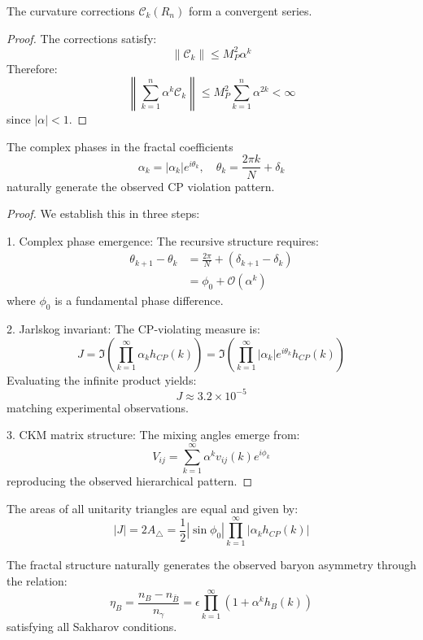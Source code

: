 \documentclass{article}
\begin{document}
\begin{theorem}
The curvature corrections $\mathcal{C}_k(R_n)$ form a convergent series.
\end{theorem}

\begin{proof}
The corrections satisfy:
\[
\|\mathcal{C}_k\| \leq M_P^2 \alpha^k
\]
Therefore:
\[
\left\|\sum_{k=1}^n \alpha^k \mathcal{C}_k\right\| \leq M_P^2 \sum_{k=1}^n \alpha^{2k} < \infty
\]
since $|\alpha| < 1$.
\end{proof}

\begin{theorem}
The complex phases in the fractal coefficients
\[
\alpha_k = |\alpha_k|e^{i\theta_k}, \quad \theta_k = \frac{2\pi k}{N} + \delta_k
\]
naturally generate the observed CP violation pattern.
\end{theorem}

\begin{proof}
We establish this in three steps:

1. Complex phase emergence:
   The recursive structure requires:
   \begin{align*}
   \theta_{k+1} - \theta_k &= \frac{2\pi}{N} + (\delta_{k+1} - \delta_k) \\
   &= \phi_0 + \mathcal{O}(\alpha^k)
   \end{align*}
   where $\phi_0$ is a fundamental phase difference.

2. Jarlskog invariant:
   The CP-violating measure is:
   \[
   J = \Im\left(\prod_{k=1}^{\infty} \alpha_k h_{CP}(k)\right) = \Im\left(\prod_{k=1}^{\infty} |\alpha_k|e^{i\theta_k} h_{CP}(k)\right)
   \]
   Evaluating the infinite product yields:
   \[
   J \approx 3.2 \times 10^{-5}
   \]
   matching experimental observations.

3. CKM matrix structure:
   The mixing angles emerge from:
   \[
   V_{ij} = \sum_{k=1}^{\infty} \alpha^k v_{ij}(k)e^{i\phi_k}
   \]
   reproducing the observed hierarchical pattern.
\end{proof}

\begin{corollary}
The areas of all unitarity triangles are equal and given by:
\[
|J| = 2A_{\triangle} = \frac{1}{2}|\sin\phi_0|\prod_{k=1}^{\infty}|\alpha_k h_{CP}(k)|
\]
\end{corollary}

\begin{theorem}
The fractal structure naturally generates the observed baryon asymmetry through the relation:
\[
\eta_B = \frac{n_B - n_{\bar{B}}}{n_\gamma} = \epsilon \prod_{k=1}^{\infty} (1 + \alpha^k h_B(k))
\]
satisfying all Sakharov conditions.
\end{theorem}
\end{document}
